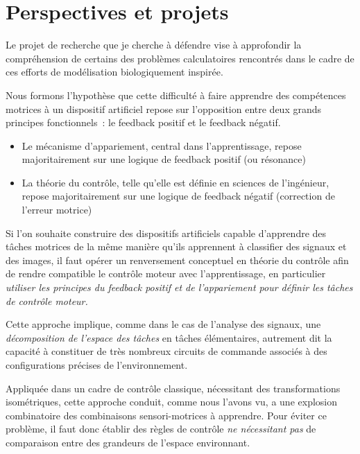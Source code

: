 \documentclass[11pt]{article}
\begin{document}
\section{Perspectives et projets}



Le projet de recherche que je cherche à défendre vise à approfondir la compréhension de certains des problèmes
calculatoires rencontrés dans le cadre de ces efforts de modélisation biologiquement inspirée.

Nous formons l'hypothèse que cette difficulté à faire apprendre des compétences motrices à un dispositif artificiel repose sur l'opposition entre deux grands principes fonctionnels~: le feedback positif et le feedback négatif.
\begin{itemize}
	\item Le mécanisme d'appariement, central dans l'apprentissage, repose majoritairement sur une logique de feedback positif (ou résonance)
	\item La théorie du contrôle, telle qu'elle est définie en sciences de l'ingénieur, repose majoritairement sur une logique de feedback négatif (correction de l'erreur motrice)
\end{itemize}


Si l'on souhaite construire des dispositifs artificiels capable d'apprendre des tâches motrices de la même manière qu'ils apprennent à classifier des signaux et des images, il faut opérer un renversement conceptuel en théorie du contrôle afin de rendre compatible le contrôle moteur avec l'apprentissage, en particulier \textit{utiliser les principes du feedback positif et de l'appariement pour définir les tâches de contrôle moteur.}

Cette approche implique, comme dans le cas de l'analyse des signaux, une \textit{décomposition de l'espace des tâches} en tâches élémentaires, autrement dit la capacité à constituer de très nombreux circuits de commande associés à des configurations précises de l'environnement. 

Appliquée dans un cadre de contrôle classique, nécessitant des transformations isométriques, cette approche conduit, comme nous l'avons vu, a une explosion combinatoire des combinaisons sensori-motrices à apprendre.
Pour éviter ce problème, il faut donc établir des règles de contrôle \textit{ne nécessitant pas} de comparaison entre des grandeurs de l'espace environnant.
\end{document}

